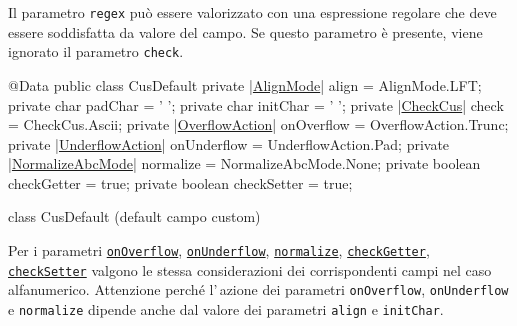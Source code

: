 \documentclass[a4paper,10pt]{report}
\newif\ifesource
\newenvironment{elisting}[1][!htb]
  {\captionsetup{aboveskip=0pt}\begin{listing}[#1]}
  {\end{listing}%
}
\begin{document}
Il parametro \verb!regex! può essere valorizzato con una espressione regolare
che deve essere soddisfatta da valore del campo. Se questo parametro è presente,
viene ignorato il parametro \verb!check!.

\ifesource
\begin{figure*}[!htb]
\begin{lstlisting}[language=java, 
caption=class CusDefault (default campo custom), 
label=lst:CusDefault]
@Data
public class CusDefault {
    private (*\hyperref[lst:AlignMode]{AlignMode}*) align = AlignMode.LFT;
    private char padChar = ' ';
    private char initChar = ' ';
    private (*\hyperref[lst:CheckCus]{CheckCus}*) check = CheckCus.Ascii;
    private (*\hyperref[lst:OverflowAction]{OverflowAction}*) onOverflow = OverflowAction.Trunc;
    private (*\hyperref[lst:UnderflowAction]{UnderflowAction}*) onUnderflow = UnderflowAction.Pad;
    private (*\hyperref[lst:NormalizeAbcMode]{NormalizeAbcMode}*) normalize = NormalizeAbcMode.None;
    private boolean checkGetter = true;
    private boolean checkSetter = true;
}
\end{lstlisting}\index{CusDefault}
\end{figure*}
\else
\begin{elisting}
\begin{javacode}
@Data
public class CusDefault {
    private |\hyperref[lst:AlignMode]{AlignMode}| align = AlignMode.LFT;
    private char padChar = ' ';
    private char initChar = ' ';
    private |\hyperref[lst:CheckCus]{CheckCus}| check = CheckCus.Ascii;
    private |\hyperref[lst:OverflowAction]{OverflowAction}| onOverflow = OverflowAction.Trunc;
    private |\hyperref[lst:UnderflowAction]{UnderflowAction}| onUnderflow = UnderflowAction.Pad;
    private |\hyperref[lst:NormalizeAbcMode]{NormalizeAbcMode}| normalize = NormalizeAbcMode.None;
    private boolean checkGetter = true;
    private boolean checkSetter = true;
}
\end{javacode}
\caption{class CusDefault (default campo custom)}
\label{lst:CusDefault}
\end{elisting}
\fi

Per i parametri \hyperlink{abc:ovf}{\texttt{onOverflow}}, 
\hyperlink{abc:unf}{\texttt{onUnderflow}}, 
\hyperlink{abc:nrm}{\texttt{normalize}},
\hyperlink{abc:get}{\texttt{checkGetter}},
\hyperlink{abc:get}{\texttt{checkSetter}} valgono le stessa considerazioni dei 
corrispondenti campi nel caso alfanumerico. Attenzione perché l'\,azione 
dei parametri \texttt{onOver\-flow}, \verb!onUnderflow! e \verb!normalize! 
dipende anche dal valore dei parametri \verb!align! e \verb!initChar!.
\end{document}
